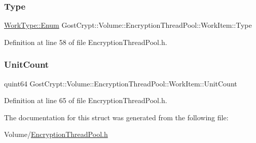 \subsubsection{\texorpdfstring{Type}{Type}}
{\footnotesize\ttfamily \hyperlink{struct_gost_crypt_1_1_volume_1_1_encryption_thread_pool_1_1_work_type_ae8c867a2b992c79f01dcc50bab7a448e}{Work\+Type\+::\+Enum} Gost\+Crypt\+::\+Volume\+::\+Encryption\+Thread\+Pool\+::\+Work\+Item\+::\+Type}



Definition at line 58 of file Encryption\+Thread\+Pool.\+h.

\mbox{\label{struct_gost_crypt_1_1_volume_1_1_encryption_thread_pool_1_1_work_item_a59eb3725bbe6e646899efca04181c0b3}} 
\subsubsection{\texorpdfstring{Unit\+Count}{UnitCount}}
{\footnotesize\ttfamily quint64 Gost\+Crypt\+::\+Volume\+::\+Encryption\+Thread\+Pool\+::\+Work\+Item\+::\+Unit\+Count}



Definition at line 65 of file Encryption\+Thread\+Pool.\+h.



The documentation for this struct was generated from the following file\+:\begin{DoxyCompactItemize}
\item 
Volume/\hyperlink{_encryption_thread_pool_8h}{Encryption\+Thread\+Pool.\+h}\end{DoxyCompactItemize}
